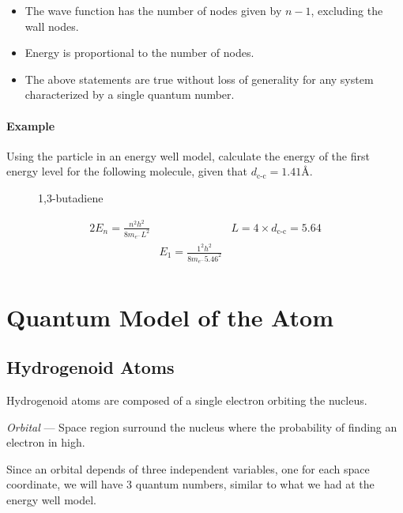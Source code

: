 \documentclass{article}[10pt]
\begin{document}
\begin{itemize}
	\item The wave function has the number of nodes given by $n-1$, excluding the wall nodes.
	\item Energy is proportional to the number of nodes.
	\item The above statements are true without loss of generality for any system characterized by a single quantum number.
\end{itemize}

\paragraph{Example}
Using the particle in an energy well model, calculate the energy of the first energy
level for the following molecule, given that $d_{\text{c-c}}=1.41\si{\angstrom}$.

\begin{figure}[H]
	\centering
	{1,3-butadiene}\label{fig:butadiene}
\end{figure}
\begin{alignat*}{2}
	E_n = \frac{n^2h^2}{8m_{e^{-}}L^2} &                                       & L=4\times d_{\text{c-c}}=5.64 \\
	                                   & E_1 = \frac{1^2h^2}{8m_{e^{-}}5.46^2} &                               \\
\end{alignat*}
\clearpage
\section{Quantum Model of the Atom}
\subsection{Hydrogenoid Atoms}
Hydrogenoid atoms are composed of a single electron orbiting the nucleus.

\emph{Orbital} --- Space region surround the nucleus where the probability of
finding an electron in high.

Since an orbital depends of three independent variables, one for each space
coordinate, we will have 3 quantum numbers, similar to what we had at the energy
well model.
\end{document}

